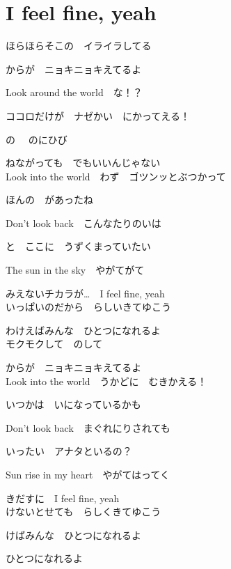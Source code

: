 \section{ I feel fine, yeah}
\large{

ほらほらそこの　イライラしてる

からが　ニョキニョキえてるよ

Look around the world　な！？

ココロだけが　ナゼかい　にかってえる！

の　 のにひび

ねながっても　でもいいんじゃない
\\

Look into the world　わず　ゴツンッとぶつかって

ほんの　があったね

Don't look back　こんなたりのいは

と　ここに　うずくまっていたい

The sun in the sky　やがてがて

みえないチカラが…　I feel fine, yeah
\\

いっぱいのだから　らしいきてゆこう

わけえばみんな　ひとつになれるよ
\\

モクモクして　のして

からが　ニョキニョキえてるよ
\\

Look into the world　うかどに　むきかえる！

いつかは　いになっているかも

Don't look back　まぐれにりされても

いったい　アナタといるの？

Sun rise in my heart　やがてはってく

きだすに　I feel fine, yeah
\\

けないとせても　らしくきてゆこう

けばみんな　ひとつになれるよ

ひとつになれるよ

}